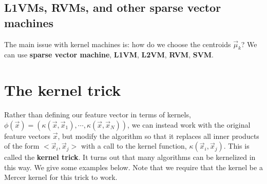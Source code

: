 \subsection{L1VMs, RVMs, and other sparse vector machines}
\label{sec:sparse-kernel-machines}
The main issue with kernel machines is: how do we choose the centroids $\vec{\mu}_k$? We can use \textbf{sparse vector machine}, \textbf{L1VM}, \textbf{L2VM}, \textbf{RVM}, \textbf{SVM}.





\section{The kernel trick}
Rather than defining our feature vector in terms of kernels, $\phi(\vec{x})=(\kappa(\vec{x},\vec{x}_1),\cdots,\kappa(\vec{x},\vec{x}_N))$, we can instead work with the original feature vectors $\vec{x}$, but modify the algorithm so that it replaces all inner products of the form $<\vec{x}_i,\vec{x}_j>$ with a call to the kernel function, $\kappa(\vec{x}_i,\vec{x}_j)$. This is called the \textbf{kernel trick}. It turns out that many algorithms can be kernelized in this way. We give some examples below. Note that we require that the kernel be a Mercer kernel for this trick to work.


